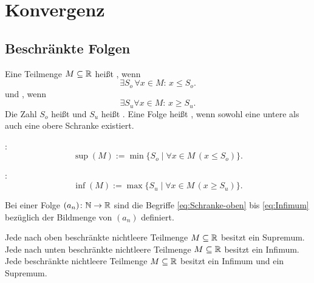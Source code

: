 \section{Konvergenz}
\subsection{Beschränkte Folgen}
\begin{definition}\mbox{}\newline
Eine Teilmenge $M\subseteq\mathbb R$ heißt ,
wenn
\begin{equation}\label{eq:Schranke-oben}
\exists S_o\,\forall x{\in}M\colon\,x\le S_o.
\end{equation}
und , wenn
\begin{equation}
\exists S_u\forall x{\in M}\colon\,x\ge S_u.
\end{equation}
Die Zahl $S_o$ heißt 
und $S_u$ heißt . Eine Folge heißt
, wenn sowohl eine untere als auch
eine obere Schranke existiert.
\end{definition}

\begin{definition}\mbox{}\newline
{}:
\begin{equation}
\sup(M) := \min\{S_o\mid \forall x{\in}M\,(x\le S_o)\}.
\end{equation}

:
\begin{equation}\label{eq:Infimum}
\inf(M) := \max\{S_u\mid \forall x{\in}M\,(x\ge S_u)\}.
\end{equation}
\end{definition}

\begin{definition}\mbox{}\newline
Bei einer Folge $(a_n)\colon\mathbb N\to\mathbb R$ sind die
Begriffe \eqref{eq:Schranke-oben}
bis \eqref{eq:Infimum} bezüglich der Bildmenge
von $(a_n)$ definiert.
\end{definition}

\noindent
Jede nach oben beschränkte nichtleere Teilmenge $M\subseteq\mathbb R$
besitzt ein Supremum.
Jede nach unten beschränkte nichtleere Teilmenge $M\subseteq\mathbb R$
besitzt ein Infimum.
Jede beschränkte nichtleere Teilmenge $M\subseteq\mathbb R$
besitzt ein Infimum und ein Supremum.

